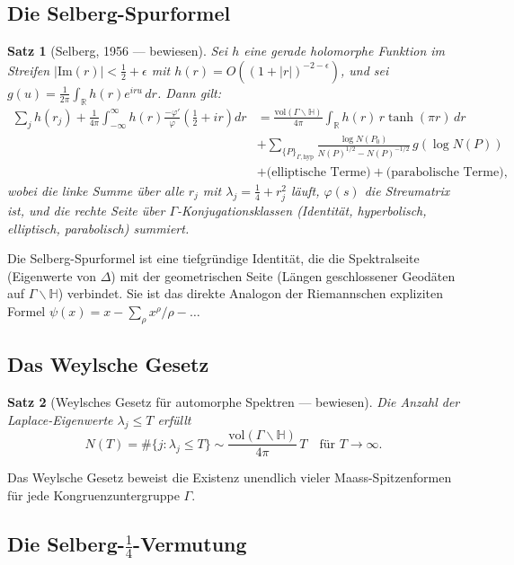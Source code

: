 \documentclass[12pt,a4paper]{amsart}
\newtheorem{theorem}{Satz}[section]
\theoremstyle{definition}
\newcommand{\HH}{\mathbb{H}}
\newcommand{\RR}{\mathbb{R}}
\newcommand{\vol}{\mathrm{vol}}
\newcommand{\im}{\mathrm{Im}}
\begin{document}
\subsection{Die Selberg-Spurformel}

\begin{theorem}[Selberg, 1956 — bewiesen]
\label{satz:selberg_spur}
Sei $h$ eine gerade holomorphe Funktion im Streifen $|\im(r)| < \frac{1}{2}+\epsilon$
mit $h(r) = O((1+|r|)^{-2-\epsilon})$, und sei $g(u) = \frac{1}{2\pi} \int_\RR h(r) e^{iru}\, dr$.
Dann gilt:
\begin{align*}
\sum_j h(r_j) + \frac{1}{4\pi}\int_{-\infty}^\infty h(r) \frac{-\varphi'}{\varphi}\!\left(\tfrac{1}{2}+ir\right) dr
&= \frac{\vol(\Gamma \backslash \HH)}{4\pi}\int_\RR h(r)\, r \tanh(\pi r)\, dr \\
&+ \sum_{\{P\}_{\Gamma,\text{hyp}}} \frac{\log N(P_0)}{N(P)^{1/2} - N(P)^{-1/2}}\, g(\log N(P)) \\
&+ \text{(elliptische Terme)} + \text{(parabolische Terme)},
\end{align*}
wobei die linke Summe über alle $r_j$ mit $\lambda_j = \frac{1}{4}+r_j^2$ läuft,
$\varphi(s)$ die Streumatrix ist, und die rechte Seite über $\Gamma$-Konjugationsklassen
(Identität, hyperbolisch, elliptisch, parabolisch) summiert.
\end{theorem}

Die Selberg-Spurformel ist eine tiefgründige Identität, die die Spektralseite
(Eigenwerte von $\Delta$) mit der geometrischen Seite (Längen geschlossener
Geodäten auf $\Gamma \backslash \HH$) verbindet. Sie ist das direkte Analogon
der Riemannschen expliziten Formel $\psi(x) = x - \sum_\rho x^\rho/\rho - \ldots$

\subsection{Das Weylsche Gesetz}

\begin{theorem}[Weylsches Gesetz für automorphe Spektren — bewiesen]
\label{satz:weyl}
Die Anzahl der Laplace-Eigenwerte $\lambda_j \leq T$ erfüllt
\[
N(T) = \#\{j : \lambda_j \leq T\} \sim \frac{\vol(\Gamma \backslash \HH)}{4\pi}\, T
\quad \text{für } T \to \infty.
\]
\end{theorem}

Das Weylsche Gesetz beweist die Existenz unendlich vieler Maass-Spitzenformen
für jede Kongruenzuntergruppe $\Gamma$.

\subsection{Die Selberg-\texorpdfstring{$\frac{1}{4}$}{1/4}-Vermutung}
\end{document}
